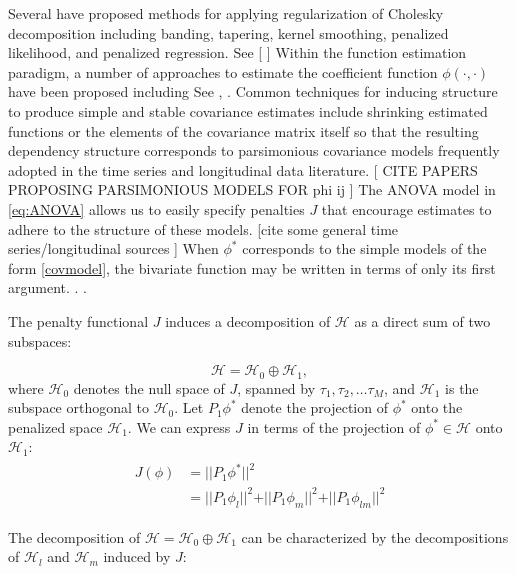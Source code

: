 \documentclass[12pt]{article}
\theoremstyle{definition}
\begin{document}
Several have proposed methods for applying regularization of Cholesky decomposition including banding, tapering, kernel smoothing, penalized likelihood, and penalized regression. See [  ] Within the function estimation paradigm, a number of  approaches to estimate the coefficient function $\phi\left(\cdot,\cdot\right)$ have been proposed including See \citet{wu2003nonparametric},  \citet{huang2007estimation} .  Common techniques for inducing structure to produce simple and stable covariance estimates include shrinking estimated functions or the elements of the covariance matrix itself so that the resulting dependency structure corresponds to parsimonious covariance models frequently adopted in the time series and longitudinal  data literature.
[
CITE PAPERS PROPOSING PARSIMONIOUS MODELS FOR phi ij
]
The ANOVA model in \ref{eq:ANOVA} allows us to easily specify penalties $J$ that encourage estimates to adhere to the structure of these models.   [cite some general time series/longitudinal sources ] When $\phi^*$ corresponds to the simple models of the form \eqref{covmodel}, the bivariate function may be written in terms of only its first argument. 
. . %

The penalty functional $J$ induces a decomposition of $\mathcal{H}$ as a direct sum of two subspaces: 

\[
\mathcal{H} = \mathcal{H}_0 \oplus \mathcal{H}_1,
\]
\noindent
where $\mathcal{H}_0$ denotes the null space of $J$, spanned by $\tau_1, \tau_2, \dots \tau_M$, and $\mathcal{H}_1$ is the subspace orthogonal to $\mathcal{H}_0$. Let $P_1 \phi^*$  denote the projection of $\phi^*$ onto the penalized space $\mathcal{H}_1$. We can express $J$ in terms of the projection of $\phi^* \in \mathcal{H}$ onto $\mathcal{H}_1$:
\begin{align}
\begin{split} 
J\left(\phi\right) &= \vert \vert P_1 \phi^* \vert \vert^2\\
&= \vert \vert {P_1 \phi_l} \vert \vert^2 + \vert \vert {P_1 \phi_m} \vert \vert^2 + \vert \vert {P_1 \phi_{lm}} \vert \vert^2  \label{eq:SS_penalty}
\end{split}
\end{align} 
\noindent

The decomposition of $\mathcal{H} = \mathcal{H}_0 \oplus\mathcal{H}_1$ can be characterized by the decompositions of $\mathcal{H}_l$ and $\mathcal{H}_m$ induced by $J$:
\end{document}

